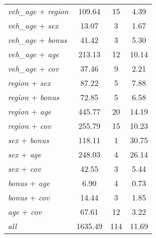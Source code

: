 {\begin{ThreePartTable}
\begin{longtable}{lccc}
    \textit{veh\_age} + \textit{region} &   109.64 &       15 &     4.39 \\
    \textit{veh\_age} + \textit{sex} &    13.07 &        3 &     1.67 \\
    \textit{veh\_age} + \textit{bonus} &    41.42 &        3 &     5.30 \\
    \textit{veh\_age} + \textit{age} &   213.13 &       12 &    10.14 \\
    \textit{veh\_age} + \textit{cov} &    37.46 &        9 &     2.21 \\
    \textit{region} + \textit{sex} &    87.22 &        5 &     7.88 \\
    \textit{region} + \textit{bonus} &    72.85 &        5 &     6.58 \\
    \textit{region} + \textit{age} &   445.77 &       20 &    14.19 \\
    \textit{region} + \textit{cov} &   255.79 &       15 &    10.23 \\
    \textit{sex} + \textit{bonus} &   118.11 &        1 &    30.75 \\
    \textit{sex} + \textit{age} &   248.03 &        4 &    26.14 \\
    \textit{sex} + \textit{cov} &    42.55 &        3 &     5.44 \\
    \textit{bonus} + \textit{age} &     6.90 &        4 &     0.73 \\
    \textit{bonus} + \textit{cov} &    14.44 &        3 &     1.85 \\
    \textit{age} + \textit{cov} &    67.61 &       12 &     3.22 \\
    \textit{all}\tnote{\ddag} &  1635.49 &      114 &    11.69 \\

\end{longtable}
\end{ThreePartTable}
}
